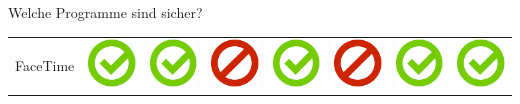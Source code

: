 \documentclass[final]{beamer}
\newlength{\twocolwid}
\begin{document}
\begin{frame}[t]
\begin{columns}[t, totalwidth=\textwidth]
\begin{column}{\twocolwid}
\begin{block}{Welche Programme sind sicher?}
\begin{tabular}{ l | C{4cm} | C{4cm} | C{4cm} | C{4.5cm} | C{4cm} | C{5cm} | C{3cm} | }
FaceTime & \includegraphics[scale=0.5]{pics/haken.png} & \includegraphics[scale=0.5]{pics/haken.png} & \includegraphics[scale=0.5]{pics/nohaken.png} & \includegraphics[scale=0.5]{pics/haken.png} & \includegraphics[scale=0.5]{pics/nohaken.png} & \includegraphics[scale=0.5]{pics/haken.png} & \includegraphics[scale=0.5]{pics/haken.png} \tabularnewline

\end{tabular}
\end{block}
\end{column}
\end{columns}
\end{frame}
\end{document}
